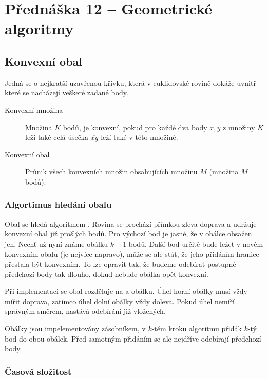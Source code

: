 \section{Přednáška 12 -- Geometrické algoritmy}

\subsection{Konvexní obal}

Jedná se o nejkratší uzavřenou křivku, která v euklidovské rovině dokáže uvnitř které se nacházejí veškeré zadané body.

\begin{description}
    \item[Konvexní množina] Množina $K$ bodů, je konvexní, pokud pro každé dva body $x, y$ z množiny $K$ leží také celá úsečka $\overline{xy}$ leží také v této množině.
    \item[Konvexní obal] Průnik všech konvexních množin obsahujících množinu $M$ (množina $M$ bodů).
\end{description}

\subsubsection{Algortimus hledání obalu}

Obal se hledá algoritmem .
Rovina se prochází přímkou zleva doprava a udržuje konvexní obal již prošlých bodů.
Pro výchozí bod je jasné, že v obálce obsažen jen.
Nechť už nyní známe obálku $k-1$ bodů.
Další bod určitě bude ležet v novém konvexním obalu (je nejvíce napravo), může se ale stát, že jeho přidáním hranice přestala být konvexním.
To lze opravit tak, že budeme odebírat postupně předchozí body tak dlouho, dokud nebude obálka opět konvexní.

Při implementaci se obal rozděluje na  a  obálku.
Úhel horní obálky musí vždy mířit doprava, zatímco úhel dolní obálky vždy doleva.
Pokud úhel nemíří správným směrem, nastává odebírání již vložených.

Obálky jsou impelementovány zásobníkem, v $k$-tém kroku algoritmu přidák $k$-tý bod do obou obálek.
Před samotným přidáním se ale nejdříve odebírají předchozí body.

\subsubsection{Časová složitost}


